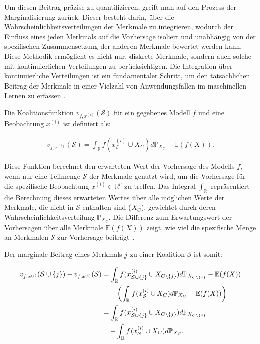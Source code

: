 Um diesen Beitrag präzise zu quantifizieren, greift man auf den Prozess der Marginalisierung zurück. 
Dieser besteht darin, über die Wahrscheinlichkeitsverteilungen der Merkmale zu integrieren, wodurch der Einfluss eines jeden Merkmals 
auf die Vorhersage isoliert und unabhängig von der spezifischen Zusammensetzung der anderen Merkmale bewertet werden kann. 
Diese Methodik ermöglicht es nicht nur, diskrete Merkmale, sondern auch solche mit kontinuierlichen Verteilungen zu berücksichtigen. 
Die Integration über kontinuierliche Verteilungen ist ein fundamentaler Schritt, um den tatsächlichen Beitrag der Merkmale in einer Vielzahl von 
Anwendungsfällen im maschinellen Lernen zu erfassen \cite[S. 29]{Molnar_2023}.

Die Koalitionsfunktion $v_{f, x^{(i)}}(\mathcal{S})$ für ein gegebenes Modell $f$ und eine Beobachtung $x^{(i)}$ ist definiert als:

\begin{align}
    \label{eq:shap-value-func}
    v_{f, x^{(i)}}(\mathcal{S}) = \int_{\mathbb{R}} f(x^{(i)}_{\mathcal{S}} \cup X_{C}) d\mathbb{P}_{X_{C}} - \mathbb{E}(f(X)).
\end{align}

Diese Funktion berechnet den erwarteten Wert der Vorhersage des Modells $f$, wenn nur eine Teilmenge $\mathcal{S}$ der 
Merkmale genutzt wird, um die Vorhersage für die spezifische Beobachtung $x^{(i)} \in \mathbb{R}^{p}$ zu treffen. 
Das Integral $\int_{\mathbb{R}}$ repräsentiert die Berechnung dieses erwarteten Wertes über alle möglichen Werte der Merkmale, 
die nicht in $\mathcal{S}$ enthalten sind ($X_C$), gewichtet durch deren Wahrscheinlichkeitsverteilung $\mathbb{P}_{X_{C}}$. 
Die Differenz zum Erwartungswert der Vorhersagen über alle Merkmale $\mathbb{E}(f(X))$ zeigt, 
wie viel die spezifische Menge an Merkmalen $\mathcal{S}$ zur Vorhersage beiträgt \cite[S. 221, S. 27]{Molnar_2022, Molnar_2023}.

Der marginale Beitrag eines Merkmals $j$ zu einer Koalition $\mathcal{S}$ ist somit:

\begin{align}
    \label{eq:shap-marginal-func}
    v_{f, x^{(i)}}(\mathcal{S} \cup \{j\}) - v_{f, x^{(i)}}(\mathcal{S}) &= \int_{\mathbb{R}} f(x^{(i)}_{\mathcal{S} \cup \{j\}} \cup X_{C \setminus \{j\}}) d\mathbb{P}_{X_{C \setminus \{j\}}} - \mathbb{E}(f(X)) \\ \notag
    &\quad - \left( \int_{\mathbb{R}} f(x^{(i)}_{\mathcal{S}} \cup X_{C}) d\mathbb{P}_{X_{C}} - \mathbb{E}(f(X)) \right) \\ \notag
    &= \int_{\mathbb{R}} f(x^{(i)}_{\mathcal{S} \cup \{j\}} \cup X_{C \setminus \{j\}}) d\mathbb{P}_{X_{C \setminus \{j\}}} \\ \notag
    &\quad - \int_{\mathbb{R}} f(x^{(i)}_{\mathcal{S}} \cup X_{C}) d\mathbb{P}_{X_{C}}.
\end{align}

